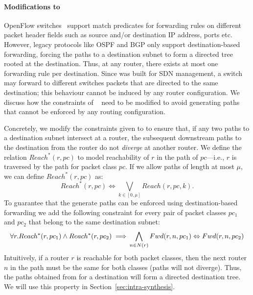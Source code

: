 \paragraph{Modifications to \genesis}
OpenFlow switches~\cite{openflow} support match predicates for
forwarding rules on different packet header fields such as source
and/or destination IP address, ports etc. However, legacy protocols
like OSPF and BGP only support destination-based forwarding, 
forcing the paths to a destination subnet to 
form a directed tree rooted at the destination. 
Thus,
at any router, there exists at most one forwarding rule per destination. 
Since \genesis was built for
SDN management,  a switch may forward to different switches
packets that are directed to the same destination;
this behaviour cannot be induced by any router
configuration. We  discuss how the
constraints of \genesis~\cite{genesis}
need to be modified to avoid generating paths that 
cannot be enforced by any routing configuration.

Concretely, we modify the constraints given to \genesis to ensure that,
if any two paths to a destination subnet intersect at a router,
the subsequent downstream paths to the destination from the
router do not \emph{diverge} at another router.  
We define the relation $Reach^*(r,pc)$ to model reachability 
of $r$ in the path of $pc$---i.e., $r$ is traversed by the path for packet class $pc$. 
If we allow paths of length at most $\mu$, we can define $Reach^*(r,pc)$ as:
\begin{equation}
	Reach^*(r,pc) \Leftrightarrow \bigvee_{k \in [0, \mu]} Reach(r, pc, k).
\end{equation}
To guarantee that the generate paths can be enforced using destination-based
forwarding we add
the following constraint for every pair of packet classes $pc_1$ and $pc_2$ that belong to the same 
 destination subnet:
 \begin{equation}
 \forall r. Reach^*(r, pc_1) \wedge Reach^*(r, pc_2) 
 \implies \\ \bigwedge_{n \in N(r)} Fwd(r, n, pc_1) \Leftrightarrow Fwd(r, n, pc_2)
 \end{equation}
Intuitively, 
 if a router $r$ is reachable for both packet classes, 
 then the next router $n$ in the path must be the same for both classes
 (paths will not diverge). Thus, the paths obtained
 from \genesis for a destination will form a 
 directed destination tree.
 We will use this property in Section~\ref{sec:intra-synthesis}. 


